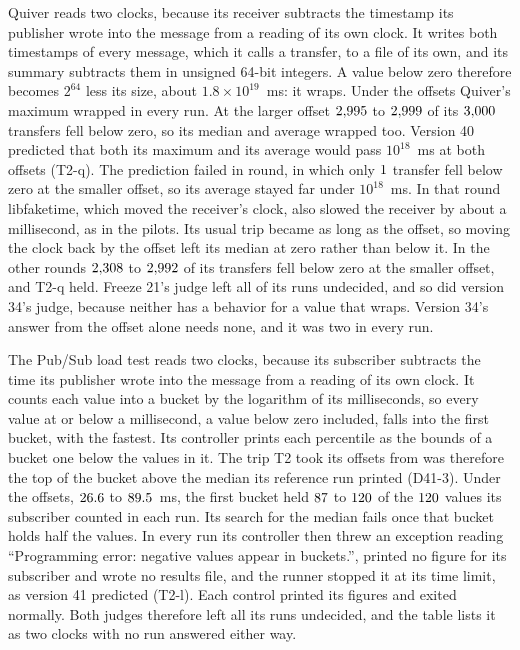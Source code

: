 \documentclass[10pt,journal,onecolumn]{IEEEtran}
\begin{document}
Quiver reads two clocks, because its receiver subtracts the timestamp its publisher wrote into the
message from a reading of its own clock. It writes both timestamps of every message, which it calls
a transfer, to a file of its own, and its summary subtracts them in unsigned 64-bit integers. A
value below zero therefore becomes $2^{64}$ less its size, about $1.8\times10^{19}$~ms: it wraps.
Under the offsets Quiver's maximum wrapped in every run. At the larger offset
$2{,}995$ to $2{,}999$ of its $3{,}000$ transfers fell
below zero, so its median and average wrapped too. Version 40 predicted that both its maximum and
its average would pass $10^{18}$~ms at both offsets (T2-q). The prediction failed in
\toolsQuiverFailedWord{} round, in which only $1$ transfer fell below zero at
the smaller offset, so its average stayed far under $10^{18}$~ms. In that round libfaketime, which
moved the receiver's clock, also slowed the receiver by about a millisecond, as in the pilots. Its
usual trip became as long as the offset, so moving the clock back by the offset left its median at
zero rather than below it. In the other \toolsQuiverHeldWord{} rounds
$2{,}308$ to $2{,}992$ of its transfers fell below zero at the
smaller offset, and T2-q held. Freeze 21's judge left all of its runs undecided, and so did version
34's judge, because neither has a behavior for a value that wraps. Version 34's answer from the
offset alone needs none, and it was two in every run.

The Pub/Sub load test reads two clocks, because its subscriber subtracts the time its publisher
wrote into the message from a reading of its own clock. It counts each value into a bucket by the
logarithm of its milliseconds, so every value at or below a millisecond, a value below zero
included, falls into the first bucket, with the fastest. Its controller prints each percentile as
the bounds of a bucket one below the values in it. The trip T2 took its offsets from was therefore
the top of the bucket above the median its reference run printed (D41-3). Under the offsets,
$26.6$ to $89.5$~ms, the first bucket held $87$
to $120$ of the $120$ values its subscriber counted in each run.
Its search for the median fails once that bucket holds half the values. In every run its controller
then threw an exception reading ``Programming error: negative values appear in buckets.'', printed
no figure for its subscriber and wrote no results file, and the runner stopped it at its time
limit, as version 41 predicted (T2-l). Each control printed its figures and exited normally. Both
judges therefore left all its runs undecided, and the table lists it as two clocks
with no run answered either way.
\end{document}
